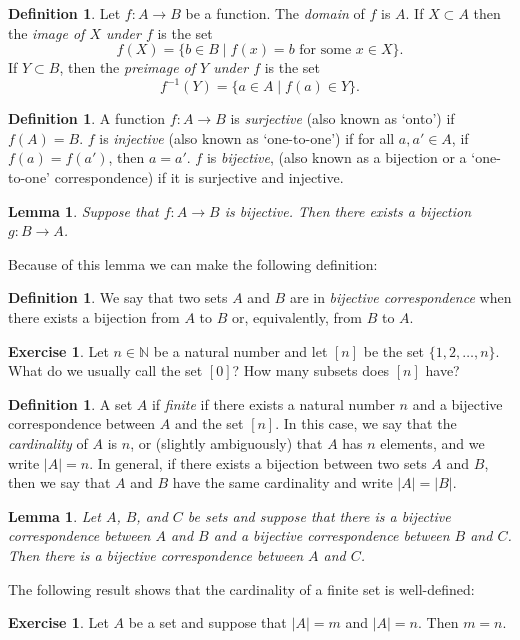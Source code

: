 \documentclass[12pt]{article}
\providecommand{\abs}[1]{\lvert #1 \rvert}
\newtheorem{lemma}[theorem]{\color{purple}Lemma}
\theoremstyle{definition}
\newtheorem{definition}[theorem]{\color{forrest}Definition}
\newtheorem{exercise}[theorem]{\color{orange}Exercise}
\numberwithin{equation}{subsection}
\begin{document}
\begin{definition}  Let $f \colon A \rightarrow B$ be a function.  The \emph{domain} of $f$ is $A$.  If $X \subset A$ then the \emph{image of $X$ under $f$} is the set
\[
f(X) = \{ b \in B \mid \text{$f(x) = b$ for some $x \in X$} \}.
\]
If $Y \subset B$, then the \emph{preimage of $Y$ under $f$} is the set
\[
f^{-1}(Y) = \{ a \in A \mid f(a) \in Y \}.
\]
\end{definition}

\begin{definition}  A function $f \colon A \rightarrow B$ is \emph{surjective} (also known as `onto') if $f(A) = B$.  $f$ is \emph{injective} (also known as `one-to-one') if for all $a, a' \in A$, if $f(a) = f(a')$, then $a = a'$.  $f$ is \emph{bijective}, (also known as a bijection or a `one-to-one' correspondence) if it is surjective and injective.
\end{definition}



\begin{lemma} Suppose that $f \colon A \rightarrow B$ is bijective.  Then there exists a bijection $g \colon B \rightarrow A$.
\end{lemma}


Because of this lemma we can make the following definition:

\begin{definition}
We say that two sets $A$ and $B$ are in \emph{bijective correspondence} when there exists a bijection from $A$ to $B$ or, equivalently, from $B$ to $A$.
\end{definition}


\begin{exercise}  Let $n \in \mathbb{N}$ be a natural number and let $[n]$ be the set $\{1, 2, \dotsc, n \}$.  What do we usually call the set $[0]$?  How many subsets does $[n]$ have?  
\end{exercise}



\begin{definition}  
A set $A$ if \emph{finite} if there exists a natural number $n$ and a bijective correspondence between $A$ and the set $[n]$.  In this case, we say that the \emph{cardinality} of $A$ is $n$, or (slightly ambiguously) that $A$ has $n$ elements, and we write $\abs{A} = n$.  In general, if there exists a bijection between two sets $A$ and $B$, then we say that $A$ and $B$ have the same cardinality and write $\abs{A} = \abs{B}$.
\end{definition}

\begin{lemma}  Let $A$, $B$, and $C$ be sets and suppose that there is a bijective correspondence between $A$ and $B$ and a bijective correspondence between $B$ and $C$.  Then there is a bijective correspondence between $A$ and $C$.
\end{lemma}

The following result shows that the cardinality of a finite set is well-defined:

\begin{exercise}  Let $A$ be a set and suppose that $\abs{A} = m$ and $\abs{A} = n$.  Then $m = n$.
\end{exercise}
\end{document}
